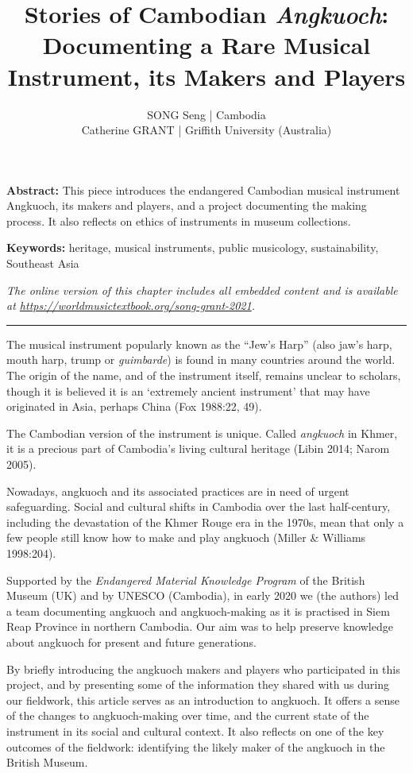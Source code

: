 \documentclass[twoside]{article}
\title{Stories of Cambodian \emph{Angkuoch}: Documenting a Rare Musical Instrument, its Makers and Players}
\author{SONG Seng | Cambodia\\Catherine GRANT | Griffith University (Australia)}
\date{}
\makeatletter
\renewcommand{\maketitle}{\bgroup\setlength{\parindent}{0pt}
\begin{flushleft}
  \vspace*{3\baselineskip}
  \huge{\textbf{\@title}}

  \medskip
  
  \large{\@author}
\end{flushleft}\egroup
}
\providecommand{\abstracttext}[1]
{
  \noindent
  \textbf{Abstract:} #1
}
\providecommand{\keywords}[1]
{
  \newline
  \textbf{Keywords:} #1
}
\providecommand{\wmturl}{\href{https://worldmusictextbook.org/song-grant-2021}{https://worldmusictextbook.org/song-grant-2021}}
\providecommand{\wmturltext}{
  \noindent\emph{The online version of this chapter includes all embedded content and is available at \wmturl.}
}
\makeatother
\begin{document}
\suppressfloats %
\maketitle

\abstracttext{This piece introduces the endangered Cambodian musical instrument Angkuoch, its makers and players, and a project documenting the making process. It also reflects on ethics of instruments in museum collections.}
\keywords{heritage, musical instruments, public musicology, sustainability, Southeast Asia}

\smallskip

\wmturltext

\medskip

\noindent\hfil\rule{0.5\textwidth}{0.4pt}\hfil

\bigskip

The musical instrument popularly known as the ``Jew's Harp'' (also jaw's
harp, mouth harp, trump or \emph{guimbarde}) is found in many countries
around the world. The origin of the name, and of the instrument itself,
remains unclear to scholars, though it is believed it is an `extremely
ancient instrument' that may have originated in Asia, perhaps China (Fox
1988:22, 49).

The Cambodian version of the instrument is unique. Called
\emph{angkuoch} in Khmer, it is a precious part of Cambodia's living
cultural heritage (Libin 2014; Narom 2005).

Nowadays, angkuoch and its associated practices are in need of urgent
safeguarding. Social and cultural shifts in Cambodia over the last
half-century, including the devastation of the Khmer Rouge era in the
1970s, mean that only a few people still know how to make and play
angkuoch (Miller \& Williams 1998:204).

Supported by the \emph{Endangered Material Knowledge Program} of the
British Museum (UK) and by UNESCO (Cambodia), in early 2020 we (the
authors) led a team documenting angkuoch and angkuoch-making as it is
practised in Siem Reap Province in northern Cambodia. Our aim was to
help preserve knowledge about angkuoch for present and future
generations.

By briefly introducing the angkuoch makers and players who participated
in this project, and by presenting some of the information they shared
with us during our fieldwork, this article serves as an introduction to
angkuoch. It offers a sense of the changes to angkuoch-making over time,
and the current state of the instrument in its social and cultural
context. It also reflects on one of the key outcomes of the fieldwork:
identifying the likely maker of the angkuoch in the British Museum.
\end{document}
